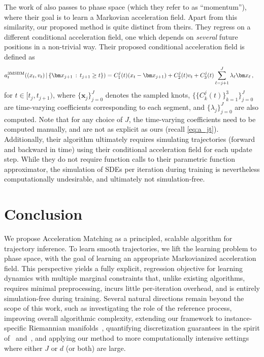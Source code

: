 \documentclass[12pt]{article}
\theoremstyle{plain}
\theoremstyle{plain}
\theoremstyle{remark}
\newcommand{\1}{\bm{1}}
\theoremstyle{plain}
\theoremstyle{definition}
\theoremstyle{remark}
\begin{document}
The work of \citet{theodoropoulos2025momentum} also passes to phase space (which they refer to as ``momentum''), where their goal is to learn a Markovian acceleration field. Apart from this similarity, our proposed method is quite distinct from theirs. They regress on a different conditional acceleration field, one which depends on \emph{several} future positions in a non-trivial way. Their proposed conditional acceleration field is defined as
\begin{align*}
    &a_t^{\rm{3MSBM}}((x_t,v_t)\,|\,\{\bm x_{j+1} \, : \, t_{j+1} \geq t\}) = C_1^j(t)(x_t - \bm x_{j+1}) + C_2^j(t) v_t + C_3^j(t)\sum_{\ell=j+1}^J \lambda_\ell \bm x_\ell\,,
\end{align*}
for $t \in [t_j, t_{j+1})$, where $\{\bm x_j\}_{j=0}^J$ denotes the sampled knots, $\{\{C_k^j(t)\}_{k=1}^3\}_{j=0}^J$ are time-varying coefficients corresponding to each segment, and $\{\lambda_j\}_{j=0}^J$ are also computed. Note that for any choice of $J$, the time-varying coefficients need to be computed manually, and are not as explicit as ours (recall \eqref{eq:a_jt}). Additionally, their algorithm ultimately requires simulating trajectories (forward and backward in time) using their conditional acceleration field for each update step. While they do not require function calls to their parametric function approximator, the simulation of SDEs per iteration during training is nevertheless computationally undesirable, and ultimately not simulation-free.

\section{Conclusion}
We propose Acceleration Matching as a principled, scalable algorithm for trajectory inference. To learn smooth trajectories, we lift the learning problem to phase space, with the goal of learning an appropriate Markovianized acceleration field. This perspective yields a fully explicit, regression objective for learning dynamics with multiple marginal constraints that, unlike existing algorithms, requires minimal preprocessing, incurs little per-iteration overhead, and is entirely simulation-free during training. Several natural directions remain beyond the scope of this work, such as investigating the role of the reference process, improving overall algorithmic complexity, extending our framework to instance-specific Riemannian manifolds~\citep{chen2023flow,yim2023se,haviv2024wasserstein}, quantifying discretization guarantees in the spirit of~\citet{chen2022sampling} and~\citet{conforti2025kl}, and applying our method to more computationally intensive settings where either $J$ or $d$ (or both) are large.
\end{document}
